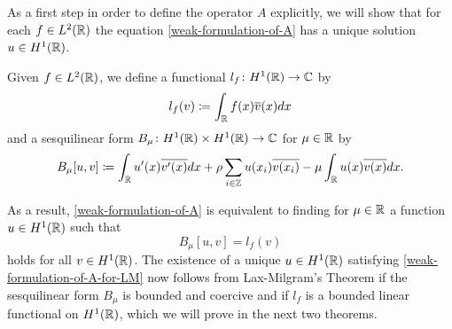 As a first step in order to define the operator $A$ explicitly, we will show that for each $f \in L^{2}(\mathbb{R})$ the equation \eqref{weak-formulation-of-A} has a unique solution $u \in H^{1}(\mathbb{R})$. 
\begin{definition}
	Given $f \in L^{2}(\mathbb{R})$, we define a functional $l_{f} \colon H^{1}(\mathbb{R}) \rightarrow \mathbb{C}$ by
	\[ l_{f}(v) \coloneqq \int_{\mathbb{R}} f(x) \overline{v}(x) dx \]
and a sesquilinear form $B_{\mu} \colon H^{1}(\mathbb{R}) \times H^{1}(\mathbb{R}) \rightarrow \mathbb{C}$ for $\mu \in \mathbb{R}$ by
	\[ B_{\mu}[u, v] \coloneqq \int_{\mathbb{R}} u'(x) \overline{v'(x)} dx + \rho \sum_{i \in \mathbb{Z}} u(x_{i}) \overline{v(x_{i})} - \mu \int_{\mathbb{R}} u(x) \overline{v(x)} dx. \]
\end{definition}
As a result, \eqref{weak-formulation-of-A} is equivalent to finding for $\mu \in \mathbb{R}$ a function $u \in H^{1}(\mathbb{R})$ such that
	\begin{equation}
		B_{\mu}[u, v] =  l_{f}(v) \label{weak-formulation-of-A-for-LM}
	\end{equation}
holds for all $v \in H^{1}(\mathbb{R})$. The existence of a unique $u \in H^{1}(\mathbb{R})$ satisfying \eqref{weak-formulation-of-A-for-LM} now follows from Lax-Milgram's Theorem if the sesquilinear form $B_{\mu}$ is bounded and coercive and if $l_{f}$ is a bounded linear functional on $H^{1}(\mathbb{R})$, which we will prove in the next two theorems.
